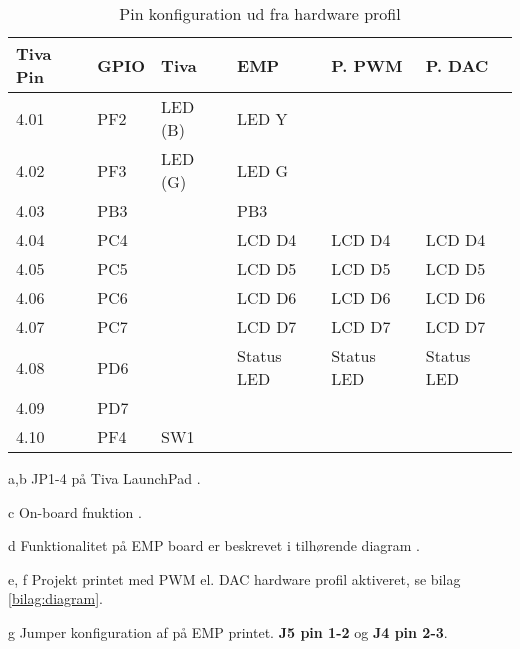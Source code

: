 \begin{table}[ht]
	\caption{Pin konfiguration ud fra hardware profil}
	\begin{threeparttable}
		\begin{tabular}{l l l l l l}
			\toprule
			\textbf{Tiva Pin\tnote{a}} 	& 
			\textbf{GPIO\tnote{b}}  	&
			\textbf{Tiva\tnote{c}} 		& 
			\textbf{EMP\tnote{d}}  		&
			\textbf{P. PWM\tnote{e}} 	&
			\textbf{P. DAC\tnote{f}}	\\ 
			\midrule
			4.01 & PF2	&LED (B)& LED Y			&				&				\\
			4.02 & PF3	&LED (G)& LED G			&				&				\\
			4.03 & PB3	&		& PB3			&				&				\\
			4.04 & PC4	&		& LCD D4		& LCD D4		& LCD D4		\\
			4.05 & PC5	&		& LCD D5		& LCD D5		& LCD D5		\\
			4.06 & PC6	&		& LCD D6		& LCD D6		& LCD D6		\\
			4.07 & PC7	&		& LCD D7		& LCD D7		& LCD D7		\\
			4.08 & PD6	&		& Status LED	& Status LED	& Status LED	\\
			4.09 & PD7	&		& 				&				&				\\
			4.10 & PF4	& SW1	& 				&				&				\\
			\bottomrule
		\end{tabular}
		
		\begin{tablenotes}
			\item[a,b] JP1-4 på Tiva LaunchPad \cite[Afsnit 2.1.5 s. 9]{spmu296}.
			\item[c] On-board fnuktion  \cite[Afsnit 2.1.5 s. 9]{spmu296}.
			\item[d] Funktionalitet på EMP board er beskrevet i tilhørende diagram \cite{emp-diagram}.
			\item[e, f] Projekt printet med PWM el. DAC hardware profil aktiveret, se bilag \ref{bilag:diagram}.
			\item[g] Jumper konfiguration af på EMP printet. \textbf{J5 pin 1-2} og \textbf{J4 pin 2-3}.
		\end{tablenotes}
	\end{threeparttable}
\end{table}